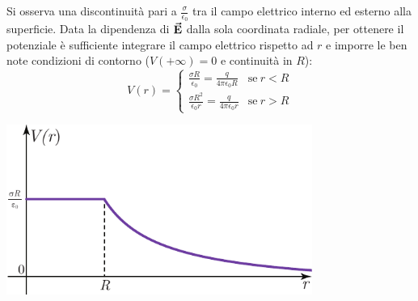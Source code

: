 Si osserva una discontinuità pari a $\frac{\sigma}{\epsilon_0}$ tra il campo elettrico interno ed esterno alla superficie.
Data la dipendenza di $\vb*{\va{E}}$ dalla sola coordinata radiale, per ottenere il potenziale è sufficiente integrare il campo elettrico rispetto ad $r$ e imporre le ben note condizioni di contorno ($V(+\infty)=0$ e continuità in $R$):
\begin{equation}
	V(r)=
	\begin{cases}
	\frac{\sigma R}{\epsilon_0}=\frac{q}{4\pi\epsilon_0 R}&\text{se}\ r< R\\
	\frac{\sigma R^2}{\epsilon_0 r}=\frac{q}{4\pi\epsilon_0 r}&\text{se}\ r> R
	\end{cases}
\end{equation}
\begin{center}
	\includegraphics[width=0.75\textwidth]{images/chp3sferacavagraf2.pdf}
\end{center}
